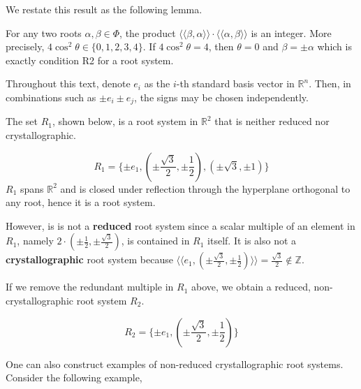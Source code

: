 We restate this result as the following lemma.
\begin{lemma}
    For any two roots $\alpha, \beta \in \Phi$, the product $\langle \langle \beta, \alpha \rangle \rangle \cdot \langle \langle \alpha, \beta \rangle \rangle$ is an integer.
    More precisely, $4 \cos^2 \theta \in \{ 0, 1, 2, 3, 4 \}.$
    If $4 \cos^2 \theta = 4$, then $\theta = 0$ and $\beta = \pm \alpha$ which is exactly condition R2 for a root system.
\end{lemma}

Throughout this text, denote $e_i$ as the $i$-th standard basis vector in $\mathbb{R}^n$. Then, in combinations such as $\pm e_i \pm e_j$, the signs may be chosen independently.

\begin{example}
    The set $R_1$, shown below, is a root system in $\mathbb{R}^2$ that is neither reduced nor crystallographic.
    
    \begin{equation*}
        R_1 = \{
            \pm e_1, (\pm \frac{\sqrt{3}}{2}, \pm \frac{1}{2}), (\pm \sqrt{3}, \pm 1) 
        \} 
    \end{equation*}
    $R_1$ spans $\mathbb{R}^2$ and is closed under reflection through the hyperplane orthogonal to any root, hence it is a root system.
    
    However, is is not a \textbf{reduced} root system since a scalar multiple of an element in $R_1$, namely $2 \cdot (\pm \frac{1}{2}, \pm \frac{\sqrt{3}}{2})$, is contained in $R_1$ itself. 
    It is also not a \textbf{crystallographic} root system because $ \langle \langle e_1, (\pm \frac{\sqrt{3}}{2}, \pm \frac{1}{2}) \rangle \rangle = \frac{\sqrt{3}}{2} \notin \mathbb{Z}$.
\end{example}

\begin{example}
    If we remove the redundant multiple in $R_1$ above, we obtain a reduced, non-crystallographic root system $R_2$.
    
    \begin{equation*}
        R_2 = \{
            \pm e_1, (\pm \frac{\sqrt{3}}{2}, \pm \frac{1}{2})
        \} 
    \end{equation*}
\end{example}

One can also construct examples of non-reduced crystallographic root systems. Consider the following example,


